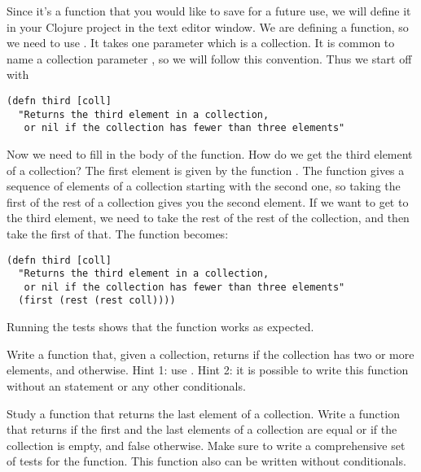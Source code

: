 Since it's a function that you would like to save for a future use, we will define it in your Clojure project in the text editor window.  
We are defining a function, so we need to use . It takes one parameter which is a collection. It is common to name a collection parameter , so we will follow this convention. Thus we start off with
\begin{framed}
\begin{verbatim}
(defn third [coll]
  "Returns the third element in a collection,
   or nil if the collection has fewer than three elements"
\end{verbatim}
\end{framed}
Now we need to fill in the body of the function. How do we get the third element of a collection? The first element is given by the function . The function  gives a sequence of elements of a collection starting with the second one, so taking the first of the rest of a collection gives you the second element. If we want to get to the third element, we need to take the rest of the rest of the collection, and then take the first of that. The function becomes:
\begin{framed}
\begin{verbatim}
(defn third [coll]
  "Returns the third element in a collection,
   or nil if the collection has fewer than three elements"
  (first (rest (rest coll))))
\end{verbatim}
\end{framed}
Running the tests shows that the function works as expected. 

\begin{exercise}\label{ex:simple-coll-functions}
Write a function  that, given a collection, returns  if the collection has two or more elements, and  otherwise. Hint 1: use . Hint 2: it is possible to write this function without an  statement or any other conditionals. 
\end{exercise}

\begin{exercise}\label{ex:last}
Study a function  that returns the last element of a collection. Write a function  that returns  if the first and the last elements of a collection are equal or if the collection is empty, and false otherwise. Make sure to write a comprehensive set of tests for the function. This function also can be written without conditionals. 
\end{exercise}

